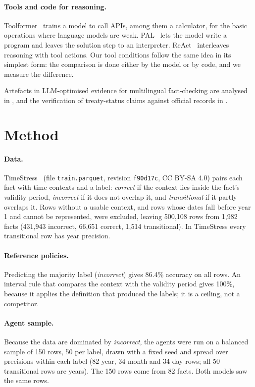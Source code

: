 \documentclass[11pt,a4paper]{article}
\newcommand{\code}[1]{\texttt{#1}}
\begin{document}
\paragraph{Tools and code for reasoning.} Toolformer~\cite{schick2023toolformer} trains a model to call APIs, among
them a calculator, for the basic operations where language models are weak. PAL~\cite{gao2023pal} lets the model write
a program and leaves the solution step to an interpreter. ReAct~\cite{yao2023react} interleaves reasoning with tool
actions. Our tool conditions follow the same idea in its simplest form: the comparison is done either by the model or
by code, and we measure the difference.

Artefacts in LLM-optimised evidence for multilingual fact-checking are analysed in \cite{hussain2026civintel}, and the verification of treaty-status claims against official records in \cite{hussain2026treaty}.

\section{Method}

\paragraph{Data.} TimeStress~\cite{khodja2025timestress} (file \code{train.parquet}, revision \code{f90d17c},
CC BY-SA 4.0) pairs each fact with time contexts and a label: \emph{correct} if the context lies inside the fact's
validity period, \emph{incorrect} if it does not overlap it, and \emph{transitional} if it partly overlaps it. Rows
without a usable context, and rows whose dates fall before year 1 and cannot be represented, were excluded, leaving
500,108 rows from 1,982 facts (431,943 incorrect, 66,651 correct, 1,514 transitional). In TimeStress every
transitional row has year precision.

\paragraph{Reference policies.} Predicting the majority label (\emph{incorrect}) gives 86.4\% accuracy on all rows.
An interval rule that compares the context with the validity period gives 100\%, because it applies the definition
that produced the labels; it is a ceiling, not a competitor.

\paragraph{Agent sample.} Because the data are dominated by \emph{incorrect}, the agents were run on a balanced sample
of 150 rows, 50 per label, drawn with a fixed seed and spread over precisions within each label (82 year, 34 month and
34 day rows; all 50 transitional rows are years). The 150 rows come from 82 facts. Both models saw the same rows.
\end{document}
